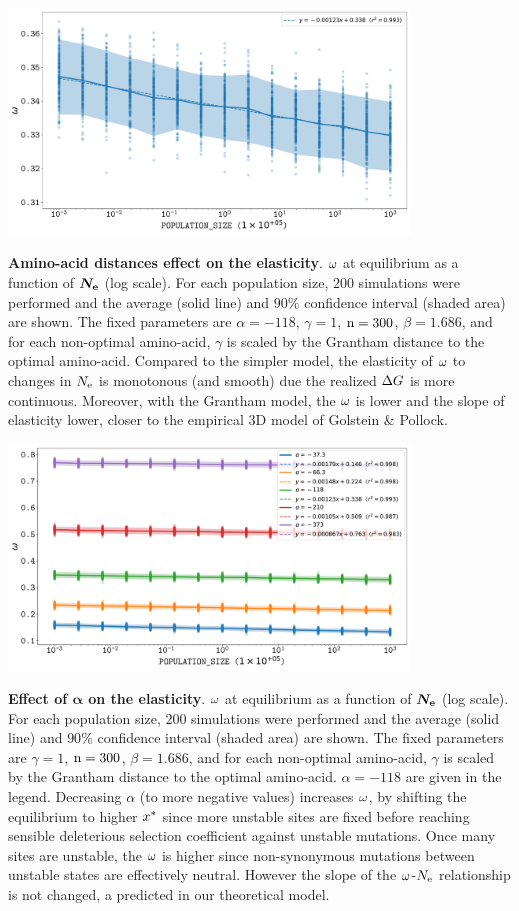 \documentclass{article}
\begin{document}
\begin{center}
	\includegraphics[width=0.8\textwidth] {artworks/SimuStab-Grantham-Elasticity.pdf}
\end{center}
\textbf{Amino-acid distances effect on the elasticity}.
$\omega$ at equilibrium as a function of $\bm{N_{\mathrm{e}}}$ (log scale).
For each population size, $200$ simulations were performed and the average (solid line) and $90\%$ confidence interval (shaded area) are shown.
The fixed parameters are $\alpha=-118$, $\gamma=1$, $\text{n}=300$, $\beta=1.686$, and for each non-optimal amino-acid, $\gamma$ is scaled by the Grantham distance to the optimal amino-acid.
Compared to the simpler model, the elasticity of $\omega$ to changes in $N_{\mathrm{e}}$ is monotonous (and smooth) due the realized $\Delta G$ is more continuous. Moreover, with the Grantham model, the $\omega$ is lower and the slope of elasticity lower, closer to the empirical 3D model of Golstein \& Pollock.

\begin{center}
	\includegraphics[width=0.8\textwidth] {artworks/SimuStab-Grantham-Alpha-Elasticity.pdf}
\end{center}
\textbf{Effect of $\bm{\alpha}$ on the elasticity}.
$\omega$ at equilibrium as a function of $\bm{N_{\mathrm{e}}}$ (log scale).
For each population size, $200$ simulations were performed and the average (solid line) and $90\%$ confidence interval (shaded area) are shown.
The fixed parameters are $\gamma=1$, $\text{n}=300$, $\beta=1.686$, and for each non-optimal amino-acid, $\gamma$ is scaled by the Grantham distance to the optimal amino-acid. $\alpha=-118$ are given in the legend.
Decreasing $\alpha$ (to more negative values) increases $\omega$, by shifting the equilibrium to higher $x^{*}$ since more unstable sites are fixed before reaching sensible deleterious selection coefficient against unstable mutations. Once many sites are unstable, the $\omega$ is higher since non-synonymous mutations between unstable states are effectively neutral. However the slope of the $\omega$-$N_{\mathrm{e}}$ relationship is not changed, a predicted in our theoretical model.
\end{document}
